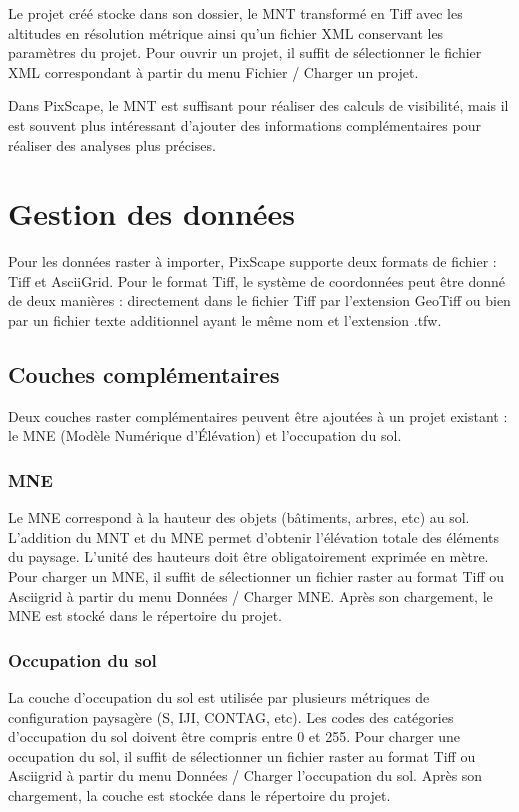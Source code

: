 \documentclass{report}
\begin{document}
Le projet créé stocke dans son dossier, le MNT transformé en Tiff avec les altitudes en résolution métrique ainsi qu'un fichier XML conservant les paramètres du projet.
Pour ouvrir un projet, il suffit de sélectionner le fichier XML correspondant à partir du menu Fichier / Charger un projet.

Dans PixScape, le MNT est suffisant pour réaliser des calculs de visibilité, mais il est souvent plus intéressant d'ajouter des informations complémentaires pour réaliser des analyses plus précises.

\section{Gestion des données}

Pour les données raster à importer, PixScape supporte deux formats de fichier : Tiff et AsciiGrid. Pour le format Tiff, le système de coordonnées peut être donné de deux manières : directement dans le fichier Tiff par l'extension GeoTiff ou bien par un fichier texte additionnel ayant le même nom et l'extension .tfw. 


\subsection{Couches complémentaires}
Deux couches raster complémentaires peuvent être ajoutées à un projet existant : le MNE (Modèle Numérique d'Élévation) et l'occupation du sol.

\subsubsection{MNE}
Le MNE correspond à la hauteur des objets (bâtiments, arbres, etc) au sol. L'addition du MNT et du MNE permet d'obtenir l'élévation totale des éléments du paysage. L'unité des hauteurs doit être obligatoirement exprimée en mètre. Pour charger un MNE, il suffit de sélectionner un fichier raster au format Tiff ou Asciigrid à partir du menu Données / Charger MNE. Après son chargement, le MNE est stocké dans le répertoire du projet.

\subsubsection{Occupation du sol}
La couche d'occupation du sol est utilisée par plusieurs métriques de configuration paysagère (S, IJI, CONTAG, etc). Les codes des catégories d'occupation du sol doivent être compris entre 0 et 255. Pour charger une occupation du sol, il suffit de sélectionner un fichier raster au format Tiff ou Asciigrid à partir du menu Données / Charger l'occupation du sol. Après son chargement, la couche est stockée dans le répertoire du projet.
\end{document}
